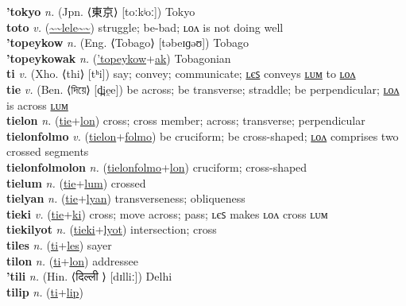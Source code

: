 \textbf{'tokyo} \textit{n.} (Jpn. ⟨東京⟩ [toːkʲoː])
Tokyo \label{'tokyo} \\
\textbf{toto} \textit{v.} (\hyperref[lele]{\~{}\~{}lele\~{}\~{}})
struggle; be-bad; ʟᴏᴧ is not doing well \label{toto} \\
\textbf{'topeykow} \textit{n.} (Eng. ⟨Tobago⟩ [təbeɪɡəʊ])
Tobago \label{'topeykow} \\
\textbf{'topeykowak} \textit{n.} (\hyperref['topeykow]{'topeykow}+\hyperref[ak]{ak})
Tobagonian \label{'topeykowak} \\
\textbf{ti} \textit{v.} (Xho. ⟨thi⟩ [tʰi])
say; convey; communicate; \hyperref[tiles]{ʟєꜱ} conveys \hyperref[tilum]{ʟᴜᴍ} to \hyperref[tilon]{ʟᴏᴧ} \label{ti} \\
\textbf{tie} \textit{v.} (Ben. ⟨দিয়ে⟩ [d̪ie̯e])
be across; be transverse; straddle; be perpendicular; \hyperref[tielon]{ʟᴏᴧ} is across \hyperref[tielum]{ʟᴜᴍ} \label{tie} \\
\textbf{tielon} \textit{n.} (\hyperref[tie]{tie}+\hyperref[lon]{lon})
cross; cross member; across; transverse; perpendicular \label{tielon} \\
\textbf{tielonfolmo} \textit{v.} (\hyperref[tielon]{tielon}+\hyperref[folmo]{folmo})
be cruciform; be cross-shaped; \hyperref[tielonfolmolon]{ʟᴏᴧ} comprises two crossed segments \label{tielonfolmo} \\
\textbf{tielonfolmolon} \textit{n.} (\hyperref[tielonfolmo]{tielonfolmo}+\hyperref[lon]{lon})
cruciform; cross-shaped \label{tielonfolmolon} \\
\textbf{tielum} \textit{n.} (\hyperref[tie]{tie}+\hyperref[lum]{lum})
crossed \label{tielum} \\
\textbf{tielyan} \textit{n.} (\hyperref[tie]{tie}+\hyperref[lyan]{lyan})
transverseness; obliqueness \label{tielyan} \\
\textbf{tieki} \textit{v.} (\hyperref[tie]{tie}+\hyperref[ki]{ki})
cross; move across; pass; ʟєꜱ makes ʟᴏᴧ cross ʟᴜᴍ \label{tieki} \\
\textbf{tiekilyot} \textit{n.} (\hyperref[tieki]{tieki}+\hyperref[lyot]{lyot})
intersection; cross \label{tiekilyot} \\
\textbf{tiles} \textit{n.} (\hyperref[ti]{ti}+\hyperref[les]{les})
sayer \label{tiles} \\
\textbf{tilon} \textit{n.} (\hyperref[ti]{ti}+\hyperref[lon]{lon})
addressee \label{tilon} \\
\textbf{'tili} \textit{n.} (Hin. ⟨दिल्ली ⟩ [dɪlliː])
Delhi \label{'tili} \\
\textbf{tilip} \textit{n.} (\hyperref[ti]{ti}+\hyperref[lip]{lip})
